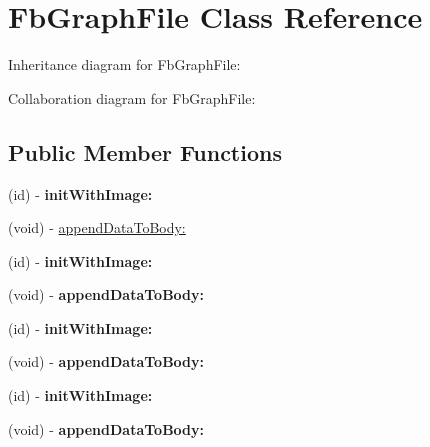 \hypertarget{interface_fb_graph_file}{
\section{\-Fb\-Graph\-File \-Class \-Reference}
\label{interface_fb_graph_file}
}


\-Inheritance diagram for \-Fb\-Graph\-File\-:


\-Collaboration diagram for \-Fb\-Graph\-File\-:
\subsection*{\-Public \-Member \-Functions}
\begin{DoxyCompactItemize}
\item 
\hypertarget{interface_fb_graph_file_a88b30cfcd52a9471de9bb3ec10342d5c}{
(id) -\/ {\bfseries init\-With\-Image\-:}}
\label{interface_fb_graph_file_a88b30cfcd52a9471de9bb3ec10342d5c}

\item 
(void) -\/ \hyperlink{interface_fb_graph_file_ab68eb5b8ec4d2c248bd7d5d0f5496de5}{append\-Data\-To\-Body\-:}
\item 
\hypertarget{interface_fb_graph_file_a88b30cfcd52a9471de9bb3ec10342d5c}{
(id) -\/ {\bfseries init\-With\-Image\-:}}
\label{interface_fb_graph_file_a88b30cfcd52a9471de9bb3ec10342d5c}

\item 
\hypertarget{interface_fb_graph_file_ab68eb5b8ec4d2c248bd7d5d0f5496de5}{
(void) -\/ {\bfseries append\-Data\-To\-Body\-:}}
\label{interface_fb_graph_file_ab68eb5b8ec4d2c248bd7d5d0f5496de5}

\item 
\hypertarget{interface_fb_graph_file_a88b30cfcd52a9471de9bb3ec10342d5c}{
(id) -\/ {\bfseries init\-With\-Image\-:}}
\label{interface_fb_graph_file_a88b30cfcd52a9471de9bb3ec10342d5c}

\item 
\hypertarget{interface_fb_graph_file_ab68eb5b8ec4d2c248bd7d5d0f5496de5}{
(void) -\/ {\bfseries append\-Data\-To\-Body\-:}}
\label{interface_fb_graph_file_ab68eb5b8ec4d2c248bd7d5d0f5496de5}

\item 
\hypertarget{interface_fb_graph_file_a88b30cfcd52a9471de9bb3ec10342d5c}{
(id) -\/ {\bfseries init\-With\-Image\-:}}
\label{interface_fb_graph_file_a88b30cfcd52a9471de9bb3ec10342d5c}

\item 
\hypertarget{interface_fb_graph_file_ab68eb5b8ec4d2c248bd7d5d0f5496de5}{
(void) -\/ {\bfseries append\-Data\-To\-Body\-:}}
\label{interface_fb_graph_file_ab68eb5b8ec4d2c248bd7d5d0f5496de5}


\end{DoxyCompactItemize}
